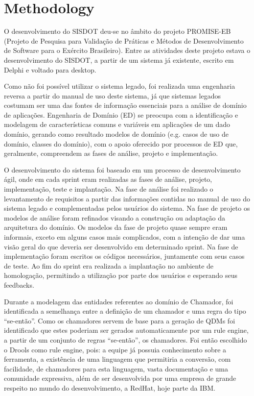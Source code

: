 \section{Methodology}\label{sec:Methodology}

O desenvolvimento do SISDOT deu-se no âmbito do projeto PROMISE-EB (Projeto de Pesquisa para Validação de Práticas e Métodos de Desenvolvimento de Software para o Exército Brasileiro). Entre as atividades deste projeto estava o desenvolvimento do SISDOT, a partir de um sistema já existente, escrito em Delphi e voltado para desktop.

Como não foi possível utilizar o sistema legado, foi realizada uma engenharia reversa a partir do manual de uso deste sistema, já que sistemas legados costumam ser uma das fontes de informação essenciais para a análise de domínio de aplicações. Engenharia de Domínio (ED) se preocupa com a identificação e modelagem de características comuns e variáveis em aplicações de um dado domínio, gerando como resultado modelos de domínio (e.g. casos de uso de domínio, classes do domínio), com o apoio oferecido por processos de ED que, geralmente, compreendem as fases de análise, projeto e implementação.

O desenvolvimento do sistema foi baseado em um processo de desenvolvimento ágil, onde em cada sprint eram realizadas as fases de análise, projeto, implementação, teste e implantação. Na fase de análise foi realizado o levantamento de requisitos a partir das informações contidas no manual de uso do sistema legado e complementadas pelos usuários do sistema. Na fase de projeto os modelos de análise foram refinados visando a construção ou adaptação da arquitetura do domínio. Os modelos da fase de projeto quase sempre eram informais, exceto em alguns casos mais complicados, com a intenção de dar uma visão geral do que deveria ser desenvolvido em determinado sprint. Na fase de implementação foram escritos os códigos necessários, juntamente com seus casos de teste. Ao fim do sprint era realizada a implantação no ambiente de homologação, permitindo a utilização por parte dos usuários e esperando seus feedbacks.

Durante a modelagem das entidades referentes ao domínio de Chamador, foi identificada a semelhança entre a definição de um chamador e uma regra do tipo ``se-então''. Como os chamadores servem de base para a geração de QDMs foi identificado que estes poderiam ser gerados automaticamente por um rule engine, a partir de um conjunto de regras ``se-então'', os chamadores. Foi então escolhido o Drools como rule engine, pois: a equipe já possuia conhecimento sobre a ferramenta, a existência de uma linguagem que permitiria a conversão, com facilidade, de chamadores para esta linguagem, vasta documentação e uma comunidade expressiva, além de ser desenvolvida por uma empresa de grande respeito no mundo do desenvolvimento, a RedHat, hoje parte da IBM.

